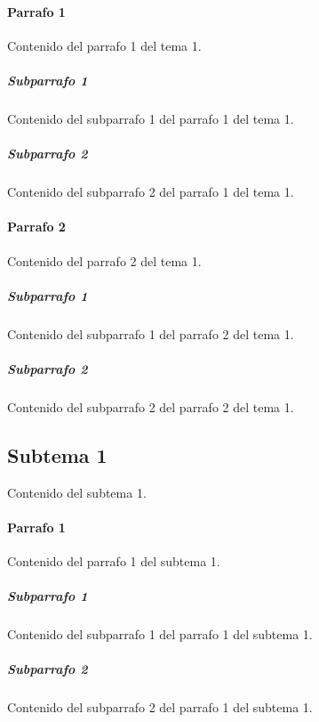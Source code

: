 \documentclass[a4paper,11pt]{article}                 %
\begin{document}
  \paragraph{Parrafo 1}                               %
  Contenido del parrafo 1 del tema 1.
  
  \subparagraph{Subparrafo 1}                         %
  Contenido del subparrafo 1 del parrafo 1 del tema 1.
  
  \subparagraph{Subparrafo 2}                         %
  Contenido del subparrafo 2 del parrafo 1 del tema 1.

  \paragraph{Parrafo 2}                               %
  Contenido del parrafo 2 del tema 1.
  
  \subparagraph{Subparrafo 1}                         %
  Contenido del subparrafo 1 del parrafo 2 del tema 1.
  
  \subparagraph{Subparrafo 2}                         %
  Contenido del subparrafo 2 del parrafo 2 del tema 1.
    
  \subsection{Subtema 1}                              %
  Contenido del subtema 1.

  \paragraph{Parrafo 1}                               %
  Contenido del parrafo 1 del subtema 1.
  
  \subparagraph{Subparrafo 1}                         %
  Contenido del subparrafo 1 del parrafo 1 del subtema 1.
  
  \subparagraph{Subparrafo 2}                         %
  Contenido del subparrafo 2 del parrafo 1 del subtema 1.
\end{document}
